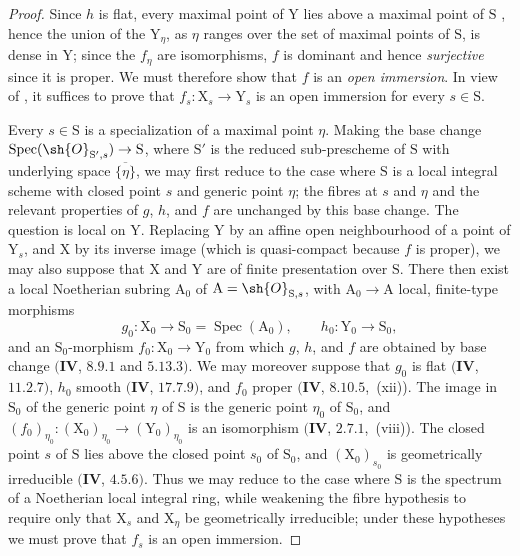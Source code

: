 \begin{proof}
Since $h$ is flat, every maximal point of $\mathrm{Y}$ lies above a maximal point of $\mathrm{S}$ , hence the union of the $\mathrm{Y}_\eta$, as $\eta$ ranges over the set of maximal points of $\mathrm{S}$, is dense in $\mathrm{Y}$; since the $f_\eta$ are isomorphisms, $f$ is dominant and hence \emph{surjective} since it is proper.
We must therefore show that $f$ is an \emph{open immersion}.
In view of , it suffices to prove that $f_s:\mathrm{X}_s\to\mathrm{Y}_s$ is an open immersion for every $s\in\mathrm{S}$.

Every $s\in\mathrm{S}$ is a specialization of a maximal point $\eta$.  Making the base change $\operatorname{Spec}(\sh{O}_{\mathrm{S}',s})\to\mathrm{S}$, where $\mathrm{S}'$ is the reduced sub-prescheme of $\mathrm{S}$ with underlying space $\overline{\{\eta\}}$, we may first reduce to the case where $\mathrm{S}$ is a local integral scheme with closed point $s$ and generic point $\eta$; the fibres at $s$ and $\eta$ and the relevant properties of $g$, $h$, and $f$ are unchanged by this base change.
The question is local on $\mathrm{Y}$.  Replacing $\mathrm{Y}$ by an affine open neighbourhood of a point of $\mathrm{Y}_s$, and $\mathrm{X}$ by its inverse image (which is quasi-compact because $f$ is proper), we may also suppose that $\mathrm{X}$ and $\mathrm{Y}$ are of finite presentation over $\mathrm{S}$.
There then exist a local Noetherian subring $\mathrm{A}_0$ of $\mathrm{A}=\sh{O}_{\mathrm{S},s}$, with $\mathrm{A}_0\to\mathrm{A}$ local, finite-type morphisms
\[
  g_0:\mathrm{X}_0\to\mathrm{S}_0=\operatorname{Spec}(\mathrm{A}_0),
  \qquad h_0:\mathrm{Y}_0\to\mathrm{S}_0,
\]
and an $\mathrm{S}_0$-morphism $f_0:\mathrm{X}_0\to\mathrm{Y}_0$ from which $g$, $h$, and $f$ are obtained by base change $(\mathbf{IV}$, $8.9.1$ and $5.13.3)$.  We may moreover suppose that $g_0$ is flat $(\mathbf{IV}$, $11.2.7)$, $h_0$ smooth $(\mathbf{IV}$, $17.7.9)$, and $f_0$ proper $(\mathbf{IV}$, $8.10.5$,~(xii)).
The image in $\mathrm{S}_0$ of the generic point $\eta$ of $\mathrm{S}$ is the generic point $\eta_0$ of $\mathrm{S}_0$, and $(f_0)_{\eta_0}:(\mathrm{X}_0)_{\eta_0}\to(\mathrm{Y}_0)_{\eta_0}$ is an isomorphism $(\mathbf{IV}$, $2.7.1$,~(viii)).  The closed point $s$ of $\mathrm{S}$ lies above the closed point $s_0$ of $\mathrm{S}_0$, and $(\mathrm{X}_0)_{s_0}$ is geometrically irreducible $(\mathbf{IV}$, $4.5.6)$.
Thus we may reduce to the case where $\mathrm{S}$ is the spectrum of a Noetherian local integral ring, while weakening the fibre hypothesis to require only that $\mathrm{X}_s$ and $\mathrm{X}_\eta$ be geometrically irreducible; under these hypotheses we must prove that $f_s$ is an open immersion.


\end{proof}
